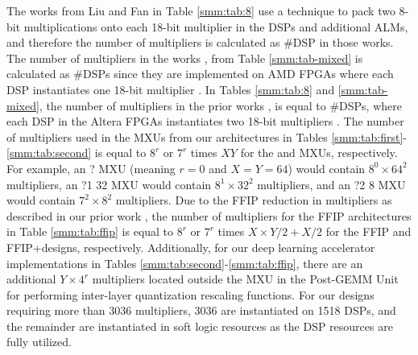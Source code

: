 The works from Liu \ea \cite{liu2022toward} and Fan \ea \cite{fan2022fpga} in Table \ref{smm:tab:8} use a technique to pack two 8-bit multiplications onto each 18-bit multiplier in the DSPs and additional ALMs, and therefore the number of multipliers is calculated as \#DSP in those works.
The number of multipliers in the works \cite{huang2022fpga}, \cite{kim2023agamotto} from Table \ref{smm:tab-mixed} is calculated as \#DSPs since they are implemented on AMD FPGAs where each DSP instantiates one 18-bit multiplier \cite{amd-dsp}.
In Tables \ref{smm:tab:8} and \ref{smm:tab-mixed}, the number of multipliers in the prior works \cite{an2022opencl}, \cite{dai2024dcp} is equal to \#DSPs, where each DSP in the Altera FPGAs instantiates two 18-bit multipliers \cite{intel-dsp}.
The number of multipliers used in the MXUs from our architectures in Tables \ref{smm:tab:first}-\ref{smm:tab:second} is equal to $8^r$ or $7^r$ times $X$\by$Y$ for the \mmArch and \smmArch MXUs, respectively.
For example, an \mm? MXU (meaning $r = 0$ and $X = Y = 64$) would contain $8^0\times64^2$ multipliers, an \mm?1 32 MXU would contain $8^1\times32^2$ multipliers, and an \smmArch?2 8 MXU would contain $7^2\times8^2$ multipliers.
Due to the FFIP reduction in multipliers as described in our prior work \cite{pogue2024fast}, the number of multipliers for the FFIP architectures in Table \ref{smm:tab:ffip} is equal to $8^r$ or $7^r$ times $X\times Y/2 + X/2$ for the FFIP and FFIP+\smmArch designs, respectively.
Additionally, for our deep learning accelerator implementations in Tables \ref{smm:tab:second}-\ref{smm:tab:ffip}, there are an additional $Y\times4^r$ multipliers located outside the MXU in the Post-GEMM Unit \cite{pogue2024fast} for performing inter-layer quantization rescaling functions.
For our designs requiring more than 3036 multipliers, 3036 are instantiated on 1518 DSPs, and the remainder are instantiated in soft logic resources as the DSP resources are fully utilized.

\label{smm:sec:results-prior-work}




